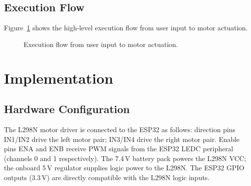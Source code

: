 \documentclass[12pt]{report}
\begin{document}
\section{Execution Flow}

Figure~\ref{fig:flow} shows the high-level execution flow from user input to
motor actuation.

\begin{figure}[H]
\centering
{}
\caption{Execution flow from user input to motor actuation.}
\label{fig:flow}
\end{figure}

\chapter{Implementation}

\section{Hardware Configuration}

The L298N motor driver is connected to the ESP32 as follows:
direction pins IN1/IN2 drive the left motor pair; IN3/IN4 drive the right motor
pair. Enable pins ENA and ENB receive PWM signals from the ESP32 LEDC peripheral
(channels 0 and 1 respectively). The 7.4\,V battery pack powers the L298N VCC;
the onboard 5\,V regulator supplies logic power to the L298N. The ESP32 GPIO
outputs (3.3\,V) are directly compatible with the L298N logic inputs.
\end{document}
